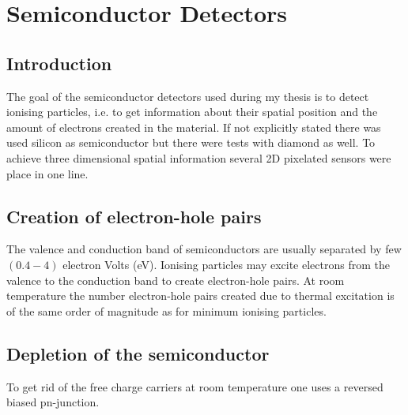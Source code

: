 \documentclass[british,11pt,a4paper]{memoir}
\begin{document}
\section{Semiconductor Detectors}
\subsection{Introduction}
The goal of the semiconductor detectors used during my thesis is to detect ionising particles, i.e. to get information about their spatial position and the amount of electrons created in the material. If not explicitly stated there was used silicon as semiconductor but there were tests with diamond as well. To achieve three dimensional spatial information several 2D pixelated sensors were place in one line.
\subsection{Creation of electron-hole pairs}
The valence and conduction band of semiconductors are usually separated by few $(0.4-4)$ electron Volts (eV). Ionising particles may excite electrons from the valence to the conduction band to create electron-hole pairs. At room temperature the number electron-hole pairs created due to thermal excitation is of the same order of magnitude as for minimum ionising particles. 
\subsection{Depletion of the semiconductor}
To get rid of the free charge carriers at room temperature one uses a reversed biased pn-junction. 
\end{document}
